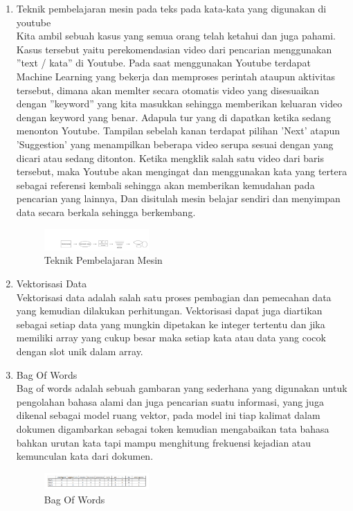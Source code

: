 \begin{enumerate}
\item Teknik pembelajaran mesin pada teks pada kata-kata yang digunakan di youtube\\
Kita ambil sebuah kasus yang semua orang telah ketahui dan juga pahami. Kasus tersebut yaitu perekomendasian video dari pencarian menggunakan ”text / kata” di Youtube. Pada saat menggunakan Youtube terdapat Machine Learning yang bekerja dan memproses perintah ataupun aktivitas tersebut, dimana akan memlter secara otomatis video yang disesuaikan dengan ”keyword” yang kita masukkan sehingga memberikan keluaran video dengan keyword yang benar. Adapula tur yang di dapatkan ketika sedang menonton Youtube. Tampilan sebelah kanan terdapat pilihan ’Next’ atapun ’Suggestion’ yang menampilkan beberapa video serupa sesuai dengan yang dicari atau sedang ditonton. Ketika mengklik salah satu video dari baris tersebut, maka Youtube akan mengingat dan menggunakan kata yang tertera sebagai referensi kembali sehingga akan memberikan kemudahan pada pencarian yang lainnya, Dan disitulah mesin belajar sendiri dan menyimpan data secara berkala sehingga berkembang.
\hfill\break
	\begin{figure}[H]
		\includegraphics[width=4cm]{figures/1174054/4/3.png}
		\centering
		\caption{Teknik Pembelajaran Mesin}
	\end{figure}

\item Vektorisasi Data\\
Vektorisasi data adalah salah satu proses pembagian dan pemecahan data yang kemudian dilakukan perhitungan. Vektorisasi dapat juga diartikan sebagai setiap data yang mungkin dipetakan ke integer tertentu dan jika memiliki array yang cukup besar maka setiap kata atau data yang cocok dengan slot unik dalam array. 

\item Bag Of Words\\
Bag of words adalah sebuah gambaran yang sederhana yang digunakan untuk pengolahan bahasa alami dan juga pencarian suatu informasi, yang juga dikenal sebagai model ruang vektor, pada model ini tiap kalimat dalam dokumen digambarkan sebagai token kemudian mengabaikan tata bahasa bahkan urutan kata tapi mampu menghitung frekuensi kejadian atau kemunculan kata dari dokumen.
\hfill\break
	\begin{figure}[H]
		\includegraphics[width=4cm]{figures/1174054/4/4.png}
		\centering
		\caption{Bag Of Words}
	\end{figure}


\end{enumerate}
